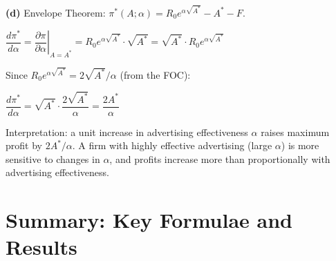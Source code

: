 \documentclass[12pt, a4paper]{article}
\theoremstyle{definition}
\newcommand{\pp}[2]{\dfrac{\partial #1}{\partial #2}}
\begin{document}
\begin{solbox}
\textbf{(d)} Envelope Theorem: $\pi^*(A;\alpha) = R_0 e^{\alpha\sqrt{A^*}}-A^*-F$.

$\dfrac{d\pi^*}{d\alpha} = \left.\pp{\pi}{\alpha}\right|_{A=A^*} = R_0 e^{\alpha\sqrt{A^*}}\cdot\sqrt{A^*} = \sqrt{A^*}\cdot R_0 e^{\alpha\sqrt{A^*}}$

Since $R_0 e^{\alpha\sqrt{A^*}} = 2\sqrt{A^*}/\alpha$ (from the FOC):

$\dfrac{d\pi^*}{d\alpha} = \sqrt{A^*}\cdot\dfrac{2\sqrt{A^*}}{\alpha} = \dfrac{2A^*}{\alpha}$

Interpretation: a unit increase in advertising effectiveness $\alpha$ raises maximum profit by $2A^*/\alpha$. A firm with highly effective advertising (large $\alpha$) is more sensitive to changes in $\alpha$, and profits increase more than proportionally with advertising effectiveness.
\end{solbox}

\section*{Summary: Key Formulae and Results}
\end{document}
